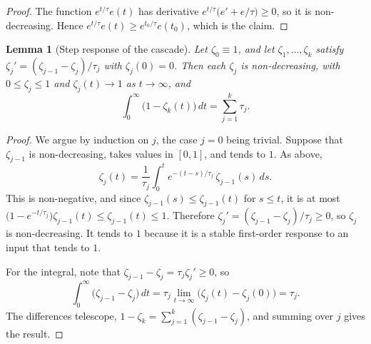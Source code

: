 \documentclass[12pt, twoside]{amsart}
\newtheorem{lemma}[theorem]{Lemma}
\theoremstyle{definition}
\begin{document}
\begin{proof}
The function $e^{t/\tau}e(t)$ has derivative $e^{t/\tau}\big(e'+e/\tau\big)\ge0$, so it is
non-decreasing. Hence $e^{t/\tau}e(t)\ge e^{t_0/\tau}e(t_0)$, which is the claim.
\end{proof}

\begin{lemma}[Step response of the cascade]\label{lem:step}
Let $\zeta_0\equiv1$, and let $\zeta_1,\dots,\zeta_k$ satisfy
$\zeta_j'=(\zeta_{j-1}-\zeta_j)/\tau_j$ with $\zeta_j(0)=0$. Then each $\zeta_j$ is non-decreasing,
with $0\le\zeta_j\le1$ and $\zeta_j(t)\to1$ as $t\to\infty$, and
\[
\int_0^\infty\big(1-\zeta_k(t)\big)\,dt=\sum_{j=1}^k\tau_j .
\]
\end{lemma}

\begin{proof}
We argue by induction on $j$, the case $j=0$ being trivial. Suppose that $\zeta_{j-1}$ is
non-decreasing, takes values in $[0,1]$, and tends to $1$. As above,
\[
\zeta_j(t)=\frac1{\tau_j}\int_0^te^{-(t-s)/\tau_j}\,\zeta_{j-1}(s)\,ds .
\]
This is non-negative, and since $\zeta_{j-1}(s)\le\zeta_{j-1}(t)$ for $s\le t$, it is at most
$\big(1-e^{-t/\tau_j}\big)\zeta_{j-1}(t)\le\zeta_{j-1}(t)\le1$. Therefore
$\zeta_j'=(\zeta_{j-1}-\zeta_j)/\tau_j\ge0$, so $\zeta_j$ is non-decreasing. It tends to $1$ because
it is a stable first-order response to an input that tends to $1$.

For the integral, note that $\zeta_{j-1}-\zeta_j=\tau_j\zeta_j'\ge0$, so
\[
\int_0^\infty\big(\zeta_{j-1}-\zeta_j\big)\,dt=\tau_j\lim_{t\to\infty}\big(\zeta_j(t)-\zeta_j(0)\big)=\tau_j .
\]
The differences telescope, $1-\zeta_k=\sum_{j=1}^k(\zeta_{j-1}-\zeta_j)$, and summing over $j$ gives
the result.
\end{proof}
\end{document}
